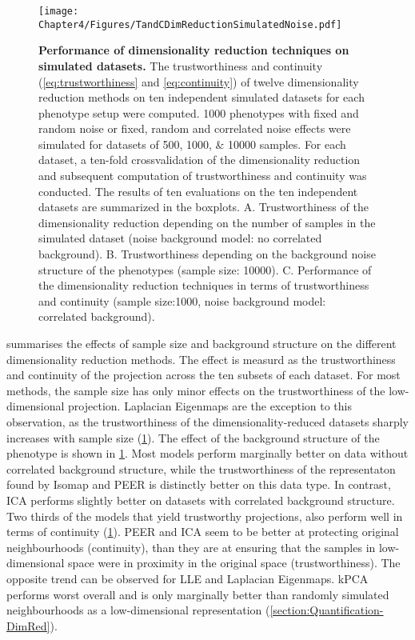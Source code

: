 \begin{figure}[hbtp]
	\centering
	\texttt{[image: Chapter4/Figures/TandCDimReductionSimulatedNoise.pdf]}
	\caption[\textbf{Performance of dimensionality reduction techniques on simulated datasets.}]{\textbf{Performance of dimensionality reduction techniques on simulated datasets.} The trustworthiness and continuity (\cref{eq:trustworthiness} and \cref{eq:continuity}) of twelve dimensionality reduction methods on ten independent simulated datasets for each phenotype setup were computed.  \num{1000} phenotypes with fixed and random noise or fixed, random and correlated noise effects were simulated for datasets of \numlist{500;1000; 10000} samples. For each dataset, a ten-fold crossvalidation of the dimensionality reduction and subsequent computation of trustworthiness and continuity was conducted. The results of ten evaluations on the ten independent datasets are summarized in the boxplots. A. Trustworthiness of the dimensionality reduction depending on the number of samples in the simulated dataset (noise background model: no correlated background). B. Trustworthiness depending on the background noise structure of the phenotypes (sample size: \num{10000}). C. Performance of the dimensionality reduction techniques in terms of trustworthiness and continuity (sample size:\num{1000}, noise background model: correlated background).}
	 	\label{fig:TaC-noise}
\end{figure}


 summarises the effects of sample size and background structure on the different dimensionality reduction methods. The effect is measurd as the trustworthiness and continuity of the projection across the ten subsets of each dataset. For most methods, the sample size has only minor effects on the trustworthiness of the low-dimensional projection. Laplacian Eigenmaps are the exception to this observation, as the trustworthiness of the dimensionality-reduced datasets sharply increases with sample size (\cref{fig:TaC-noise}). The effect of the background structure of the phenotype is shown in \cref{fig:TaC-noise}. Most models perform marginally better on data without correlated background structure, while the trustworthiness of the representaton found by Isomap and PEER is distinctly better on this data type. In contrast, ICA performs slightly better on datasets with correlated background structure. Two thirds of the models that yield trustworthy projections, also perform well in terms of continuity (\cref{fig:TaC-noise}). PEER and ICA seem to be better at protecting original neighbourhoods (continuity), than they are at ensuring that the samples in low-dimensional space were in proximity in the original space (trustworthiness). The opposite trend can be observed for LLE and Laplacian Eigenmaps. kPCA performs worst overall and is only marginally better than randomly simulated neighbourhoods as a low-dimensional representation (\cref{section:Quantification-DimRed}).

